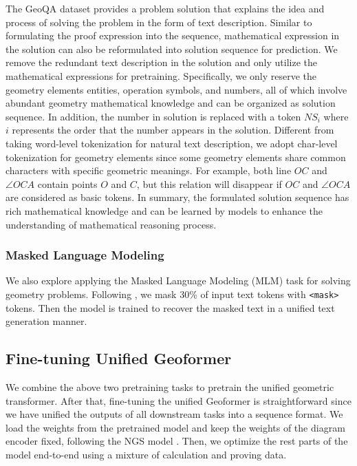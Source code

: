 \documentclass[11pt]{article}
\begin{document}
The GeoQA dataset provides a problem solution that explains the idea and process of solving the problem in the form of text description.
Similar to formulating the proof expression into the sequence, mathematical expression in the solution can also be reformulated into solution sequence for prediction.
We remove the redundant text description in the solution and only utilize the mathematical expressions for pretraining. Specifically, we only reserve the geometry elements entities, operation symbols, and numbers, all of which involve abundant geometry mathematical knowledge and can be organized as solution sequence.
In addition, the number in solution is replaced with a token ${NS}_{i}$ where $i$ represents the order that the number appears in the solution. 
Different from taking word-level tokenization for natural text description, we adopt char-level tokenization for geometry elements since some geometry elements share common characters with specific geometric meanings.
For example, both line $OC$ and $\angle OCA$ contain points $O$ and $C$, but this relation will disappear if $OC$ and $\angle OCA$ are considered as basic tokens. 
In summary, the formulated solution sequence has rich mathematical knowledge and can be learned by models to enhance the understanding of mathematical reasoning process.



\subsubsection{Masked Language Modeling}
We also explore applying the Masked Language Modeling (MLM) task for solving geometry problems.
Following \cite{cho2021unifying},  we mask 30\% of input text tokens with \texttt{<mask>} tokens. Then the model is trained to recover the masked text in a unified text generation manner.



\subsection{Fine-tuning Unified Geoformer}

We combine the above two pretraining tasks to pretrain the unified geometric transformer.
After that, fine-tuning the unified Geoformer is straightforward since we have unified the outputs of all downstream tasks into a sequence format.
We load the weights from the pretrained model and keep the weights of the diagram encoder fixed, following the NGS model \cite{chen2021geoqa}.
Then, we optimize the rest parts of the model end-to-end using a mixture of calculation and proving data.
\end{document}
